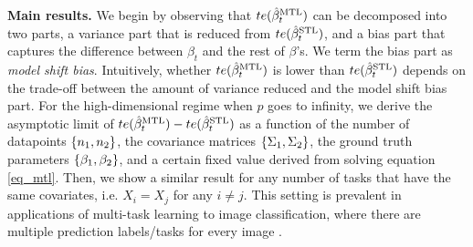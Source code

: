 



	\textbf{Main results.}
	We begin by observing that $te(\hat{\beta}_t^{\text{MTL}})$ can be decomposed into two parts, a variance part that is reduced from $te(\hat{\beta}_t^{\text{STL}})$, and a bias part that captures the difference between $\beta_t$ and the rest of $\beta$'s.
	We term the bias part as \textit{model shift bias}.
	Intuitively, whether $te(\hat{\beta}_t^{\text{MTL}})$ is lower than $te(\hat{\beta}_t^{\text{STL}})$ depends on the trade-off between the amount of variance reduced and the model shift bias part.
	For the high-dimensional regime when $p$ goes to infinity, we derive the asymptotic limit of $te(\hat{\beta}_t^{\text{MTL}}) - te(\hat{\beta}_t^{\text{STL}})$ as a function of the number of datapoints $\{n_1, n_2\}$, the covariance matrices $\{\Sigma_1, \Sigma_2\}$, the ground truth parameters $\{\beta_1, \beta_2\}$, and a certain fixed value derived from solving equation \eqref{eq_mtl}.
	Then, we show a similar result for any number of tasks that have the same covariates, i.e. $X_i = X_j$ for any $i \neq j$.
	This setting is prevalent in applications of multi-task learning to image classification, where there are multiple prediction labels/tasks for every image \cite{chexnet17,EA20}.


